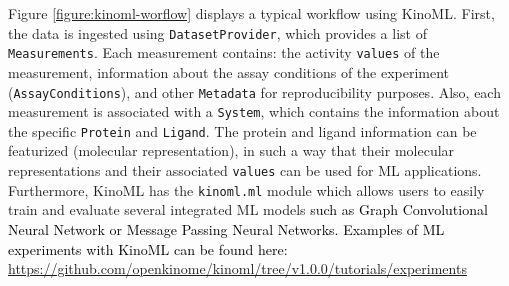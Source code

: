 \documentclass[9pt,lessons]{livecoms}
\newcommand{\revision}[1]{\textcolor{black}{#1}}
\begin{document}
Figure \ref{figure:kinoml-worflow} displays a typical workflow using KinoML. First, the data is ingested using \texttt{DatasetProvider}, which provides a list of \texttt{Measurements}. Each measurement contains: the activity \texttt{values} of the measurement, information about the assay conditions of the experiment (\texttt{AssayConditions}), and other \texttt{Metadata} for reproducibility purposes. Also, each measurement is associated with a \texttt{System}, which contains the information about the specific \texttt{Protein} and \texttt{Ligand}. The protein and ligand information can be featurized (molecular representation), in such a way that their molecular representations and their associated \texttt{values} can be used for ML applications. Furthermore, KinoML has the \texttt{kinoml.ml} module which allows users to easily train and evaluate several integrated ML models \revision{such as Graph Convolutional Neural Network or Message Passing Neural Networks. Examples of ML experiments with KinoML can be found here: \url{https://github.com/openkinome/kinoml/tree/v1.0.0/tutorials/experiments}}
\end{document}
